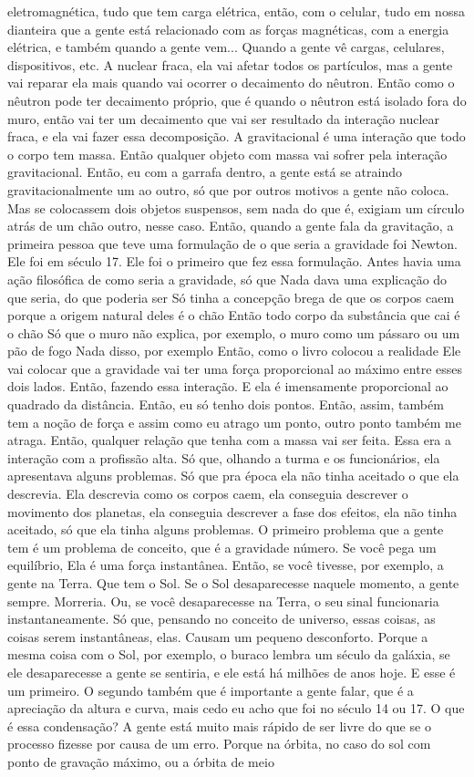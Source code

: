 \documentclass[
	article,			%
	11pt,				%
	twoside,			%
	a4paper,			%
	english,			%
	brazil,				%
	sumario=tradicional
	]{abntex2}
\begin{document}
eletromagnética, tudo que tem carga elétrica, então, com o celular, tudo em nossa dianteira que a gente está relacionado com as forças magnéticas, com a energia elétrica, e também quando a gente vem... Quando a gente vê cargas, celulares, dispositivos, etc. A nuclear fraca, ela vai afetar todos os partículos, mas a gente vai reparar ela mais quando vai ocorrer o decaimento do nêutron. Então como o nêutron pode ter decaimento próprio, que é quando o nêutron está isolado fora do muro, então vai ter um decaimento que vai ser resultado da interação nuclear fraca, e ela vai fazer essa decomposição. A gravitacional é uma interação que todo o corpo tem massa. Então qualquer objeto com massa vai sofrer pela interação gravitacional. Então, eu com a garrafa dentro, a gente está se atraindo gravitacionalmente um ao outro, só que por outros motivos a gente não coloca. Mas se colocassem dois objetos suspensos, sem nada do que é, exigiam um círculo atrás de um chão outro, nesse caso. Então, quando a gente fala da gravitação, a primeira pessoa que teve uma formulação de o que seria a gravidade foi Newton. Ele foi em século 17. Ele foi o primeiro que fez essa formulação. Antes havia uma ação filosófica de como seria a gravidade, só que Nada dava uma explicação do que seria, do que poderia ser Só tinha a concepção brega de que os corpos caem porque a origem natural deles é o chão Então todo corpo da substância que cai é o chão Só que o muro não explica, por exemplo, o muro como um pássaro ou um pão de fogo Nada disso, por exemplo Então, como o livro colocou a realidade Ele vai colocar que a gravidade vai ter uma força proporcional ao máximo entre esses dois lados. Então, fazendo essa interação. E ela é imensamente proporcional ao quadrado da distância. Então, eu só tenho dois pontos. Então, assim, também tem a noção de força e assim como eu atrago um ponto, outro ponto também me atraga. Então, qualquer relação que tenha com a massa vai ser feita. Essa era a interação com a profissão alta. Só que, olhando a turma e os funcionários, ela apresentava alguns problemas. Só que pra época ela não tinha aceitado o que ela descrevia. Ela descrevia como os corpos caem, ela conseguia descrever o movimento dos planetas, ela conseguia descrever a fase dos efeitos, ela não tinha aceitado, só que ela tinha alguns problemas. O primeiro problema que a gente tem é um problema de conceito, que é a gravidade número. Se você pega um equilíbrio, Ela é uma força instantânea. Então, se você tivesse, por exemplo, a gente na Terra. Que tem o Sol. Se o Sol desaparecesse naquele momento, a gente sempre. Morreria. Ou, se você desaparecesse na Terra, o seu sinal funcionaria instantaneamente. Só que, pensando no conceito de universo, essas coisas, as coisas serem instantâneas, elas. Causam um pequeno desconforto. Porque a mesma coisa com o Sol, por exemplo, o buraco lembra um século da galáxia, se ele desaparecesse a gente se sentiria, e ele está há milhões de anos hoje. E esse é um primeiro. O segundo também que é importante a gente falar, que é a apreciação da altura e curva, mais cedo eu acho que foi no século 14 ou 17. O que é essa condensação? A gente está muito mais rápido de ser livre do que se o processo fizesse por causa de um erro. Porque na órbita, no caso do sol com ponto de gravação máximo, ou a órbita de meio 
\end{document}
